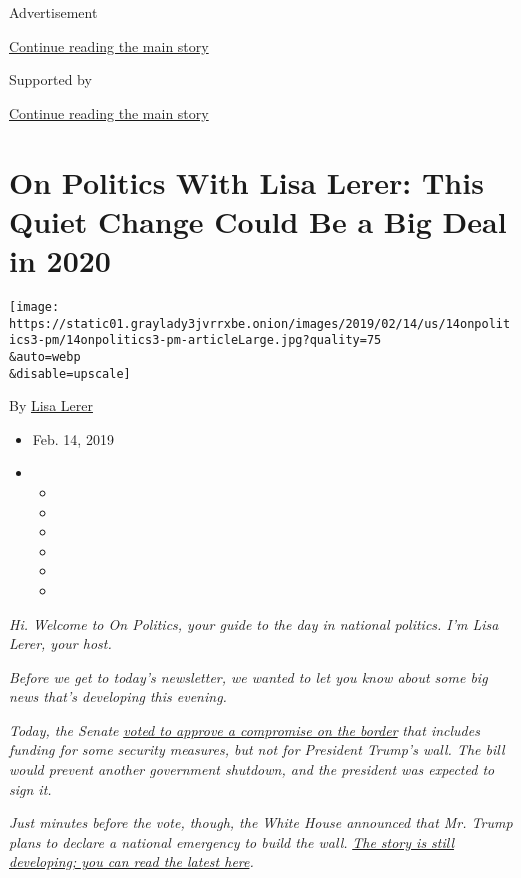 Advertisement

\protect\hyperlink{after-top}{Continue reading the main story}

Supported by

\protect\hyperlink{after-sponsor}{Continue reading the main story}

\hypertarget{on-politics-with-lisa-lerer-this-quiet-change-could-be-a-big-deal-in-2020}{%
\section{On Politics With Lisa Lerer: This Quiet Change Could Be a Big
Deal in
2020}\label{on-politics-with-lisa-lerer-this-quiet-change-could-be-a-big-deal-in-2020}}

\texttt{[image: https://static01.graylady3jvrrxbe.onion/images/2019/02/14/us/14onpolitics3-pm/14onpolitics3-pm-articleLarge.jpg?quality=75\\\&auto=webp\\\&disable=upscale]}

By \href{https://www.nytimes3xbfgragh.onion/by/lisa-lerer}{Lisa Lerer}

\begin{itemize}
\item
  Feb. 14, 2019
\item
  \begin{itemize}
  \item
  \item
  \item
  \item
  \item
  \item
  \end{itemize}
\end{itemize}

\emph{Hi. Welcome to On Politics, your guide to the day in national
politics. I'm Lisa Lerer, your host.}

\emph{Before we get to today's newsletter, we wanted to let you know
about some big news that's developing this evening.}

\emph{Today, the Senate}
\href{https://www.nytimes3xbfgragh.onion/2019/02/14/us/politics/congress-trump-border-deal-wall.html}{\emph{voted
to approve a compromise on the border}} \emph{that includes funding for
some security measures, but not for President Trump's wall. The bill
would prevent another government shutdown, and the president was
expected to sign it.}

\emph{Just minutes before the vote, though, the White House announced
that Mr. Trump plans to declare a national emergency to build the wall.}
\href{https://www.nytimes3xbfgragh.onion/2019/02/14/us/politics/trump-national-emergency-border.html}{\emph{The
story is still developing; you can read the latest here}}\emph{.}

